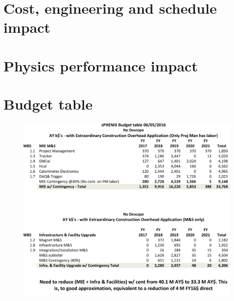 
\chapter{Cost, engineering and schedule impact}
\label{cha:engineering}




%





\chapter{Physics performance impact}
\label{cha:performance}



\chapter{Budget table}
\label{cha:budget}

\begin{figure}
  \centering
  \includegraphics[width=1\linewidth]{figs/sPHENIX_MIE_Infra_Facility_budget_060516}
  \label{fig:budget}
\end{figure}

